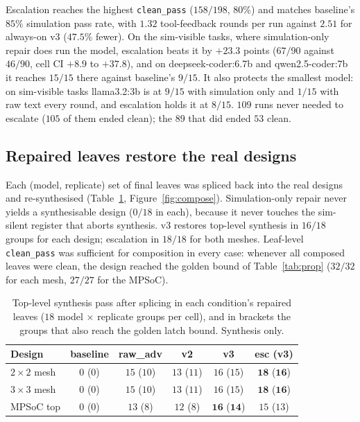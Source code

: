 \documentclass[11pt]{article}
\begin{document}
Escalation reaches the highest \texttt{clean\_pass} ($158/198$, $80\%$) and
matches baseline's $85\%$ simulation pass rate, with $1.32$ tool-feedback
rounds per run against $2.51$ for always-on v3 ($47.5\%$ fewer). On the
sim-visible tasks, where simulation-only repair does run the model, escalation
beats it by $+23.3$ points ($67/90$ against $46/90$, cell CI $+8.9$ to
$+37.8$), and on deepseek-coder:6.7b and qwen2.5-coder:7b it reaches $15/15$
there against baseline's $9/15$. It also protects the smallest model: on
sim-visible tasks llama3.2:3b is at $9/15$ with simulation only and $1/15$ with
raw text every round, and escalation holds it at $8/15$. $109$ runs never
needed to escalate ($105$ of them ended clean); the $89$ that did ended $53$
clean.

\subsection{Repaired leaves restore the real designs}
\label{sec:res-compose}

Each (model, replicate) set of final leaves was spliced back into the real
designs and re-synthesised (Table~\ref{tab:compose},
Figure~\ref{fig:compose}). Simulation-only repair never yields a synthesisable
design ($0/18$ in each), because it never touches the sim-silent register
that aborts synthesis. v3 restores top-level synthesis in $16/18$ groups for
each design; escalation in $18/18$ for both meshes. Leaf-level
\texttt{clean\_pass} was sufficient for composition in every case: whenever
all composed leaves were clean, the design reached the golden bound of
Table~\ref{tab:prop} ($32/32$ for each mesh, $27/27$ for the MPSoC).

\begin{table}[htbp]
\centering
\caption{Top-level synthesis pass after splicing in each condition's repaired
leaves ($18$ model $\times$ replicate groups per cell), and in brackets the
groups that also reach the golden latch bound. Synthesis only.}
\label{tab:compose}
\small
\begin{tabularx}{\linewidth}{@{} X c c c c c @{}}
\toprule
\textbf{Design} & \textbf{baseline} & \textbf{raw\_adv} & \textbf{v2} & \textbf{v3} & \textbf{esc (v3)} \\
\midrule
$2{\times}2$ mesh & $0$ ($0$) & $15$ ($10$) & $13$ ($11$) & $16$ ($15$) & $\mathbf{18}$ ($\mathbf{16}$) \\
$3{\times}3$ mesh & $0$ ($0$) & $15$ ($10$) & $13$ ($11$) & $16$ ($15$) & $\mathbf{18}$ ($\mathbf{16}$) \\
MPSoC top         & $0$ ($0$) & $13$ ($8$)  & $12$ ($8$)  & $\mathbf{16}$ ($\mathbf{14}$) & $15$ ($13$) \\
\bottomrule
\end{tabularx}
\end{table}
\end{document}
